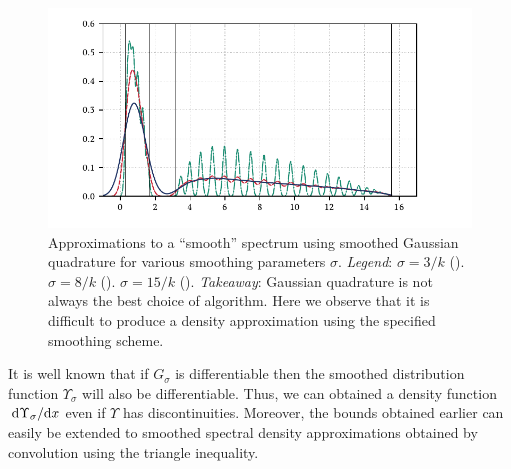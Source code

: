 \begin{figure}[htb]
\includegraphics[width=\textwidth]{imgs/ch4_RM_split_GQ.pdf}
    \caption[{Approximations to a ``smooth'' spectrum using smoothed Gaussian quadrature for various smoothing parameters \( \sigma \).}]{%
    Approximations to a ``smooth'' spectrum using smoothed Gaussian quadrature for various smoothing parameters \( \sigma \).
    \hspace{.25em}\emph{Legend}:
    \( \sigma = 3/k \) 
        ({\protect{}}).
    \( \sigma = 8/k \) 
        ({\protect{}}).
    \( \sigma = 15/k \) 
        ({\protect{}}).
    \hspace{.25em}\emph{Takeaway}: Gaussian quadrature is not always the best choice of algorithm. 
    Here we observe that it is difficult to produce a density approximation using the specified smoothing scheme.
}
\label{fig:GQ_conv_smoothing}
\end{figure}


It is well known that if \( G_\sigma \) is differentiable then the smoothed distribution function \( \Upsilon_\sigma \) will also be differentiable.
Thus, we can obtained a density function \( \,\textup{d}\Upsilon_\sigma/\textup{d}{x} \) even if \( \Upsilon \) has discontinuities.
Moreover, the bounds obtained earlier can easily be extended to smoothed spectral density approximations obtained by convolution using the triangle inequality.

